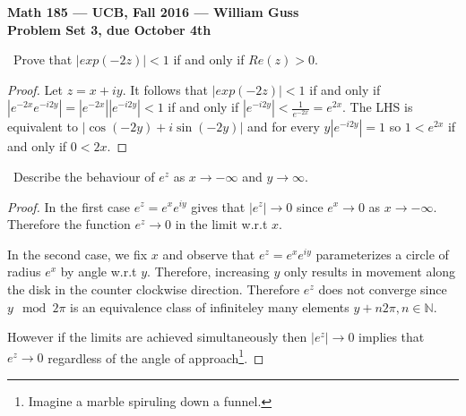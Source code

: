 \documentclass[11pt]{amsart}
\theoremstyle{definition}
\numberwithin{theorem}{section}
\numberwithin{definition}{section}
\numberwithin{equation}{section}
\begin{document}
\begin{center}{\bf Math 185 --- UCB, Fall 2016 --- William Guss}
\\
{\bf Problem Set 3, due October 4th}
\end{center}

\medskip {}\ Prove that $|exp(-2z)| < 1$ if and only if $Re(z) > 0$.
\begin{proof}
	Let $z = x +iy$. It follows that $|exp(-2z)| < 1$ if and only if $|e^{-2x}e^{-i2y}| = |e^{-2x}||e^{-i2y}| < 1$
	if and only if $|e^{-i2y}| < \frac{1}{e^{-2x}} = e^{2x}.$ The LHS is equivalent to $|\cos({-2y}) +i\sin(-2y)|$ and for every $y |e^{-i2y}| = 1$ so $1 < e^{2x}$ if and only if $ 0 < 2x.$
\end{proof}


\medskip {}\ Describe the behaviour of $e^z$ as $x \to -\infty$ and $y \to \infty$.
\begin{proof}
	In the first case $e^z = e^xe^{iy}$ gives that $|e^z| \to 0$ since $e^{x} \to 0$ as $x \to - \infty.$ Therefore the function $e^z \to 0$ in the limit w.r.t $x$.

	In the second case, we fix $x$ and observe that $e^z = e^xe^{iy}$ parameterizes a circle of radius $e^x$  by angle w.r.t $y$. Therefore, increasing $y$ only results in movement along the disk in the counter clockwise direction. Therefore $e^z$ does not converge since $y \mod 2\pi$ is an equivalence class of infiniteley many elements $y + n2\pi, n \in \mathbb{N}$. 

	However if the limits are achieved simultaneously then $|e^z| \to 0$ implies that $e^z \to 0$ regardless of the angle of approach\footnote{Imagine a marble spiruling down a funnel.}.
\end{proof}
\end{document}
